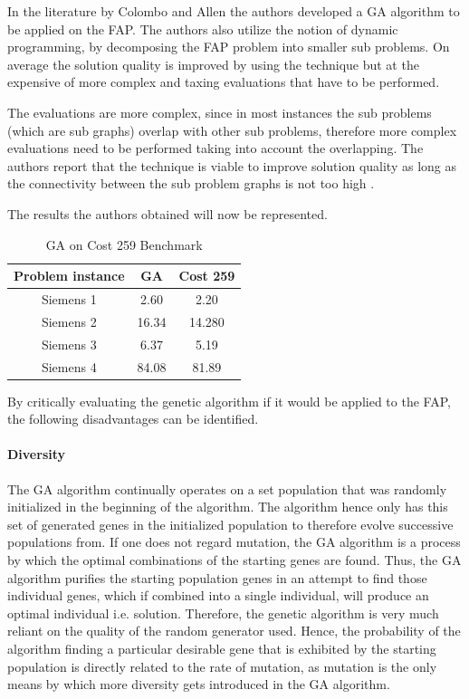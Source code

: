 In the literature by Colombo and Allen\cite{ProblemDecompMIFAP} the authors developed a GA algorithm to be applied on the FAP. The authors also utilize the notion of dynamic programming, by decomposing the FAP problem into smaller sub problems. On average the solution quality is improved by using the technique but at the expensive of more complex and taxing evaluations that have to be performed\cite{ProblemDecompMIFAP}. 

The evaluations are more complex, since in most instances the sub problems (which are sub graphs) overlap with other sub problems, therefore more complex evaluations need to be performed taking into account the overlapping\cite{ProblemDecompMIFAP}. The authors report that the technique is viable to improve solution quality as long as the connectivity between the sub problem graphs is not too high \cite{ProblemDecompMIFAP}.

The results the authors obtained will now be represented.

\begin{table}
\centering
	\begin{tabular}{| c | c | c |}
	\hline
	Problem instance & GA & Cost 259 \\ \hline
	Siemens 1 & 2.60 & 2.20 \\ \hline
	Siemens 2 & 16.34 & 14.280 \\ \hline
	Siemens 3 & 6.37 & 5.19 \\ \hline
	Siemens 4 & 84.08 & 81.89 \\ \hline
	\end{tabular}
\caption{GA on Cost 259 Benchmark}
\end{table}

By critically evaluating the genetic algorithm if it would be applied to the FAP, the following disadvantages can be identified.

\paragraph{Diversity}
The GA algorithm continually operates on a set population that was randomly initialized in the beginning of the algorithm. The algorithm hence only has this set of generated genes in the initialized population to therefore evolve successive populations from.
If one does not regard mutation, the GA algorithm is a process by which the optimal combinations of the starting genes are found. Thus, the GA algorithm purifies the starting population genes in an attempt to find those individual genes, which if combined into a single individual, will produce an optimal individual i.e. solution. Therefore, the genetic algorithm is very much reliant on the quality of the random generator used. Hence, the probability of the algorithm finding a particular desirable gene that is exhibited by the starting population is directly related to the rate of mutation, as mutation is the only means by which more diversity gets introduced in the GA algorithm.
